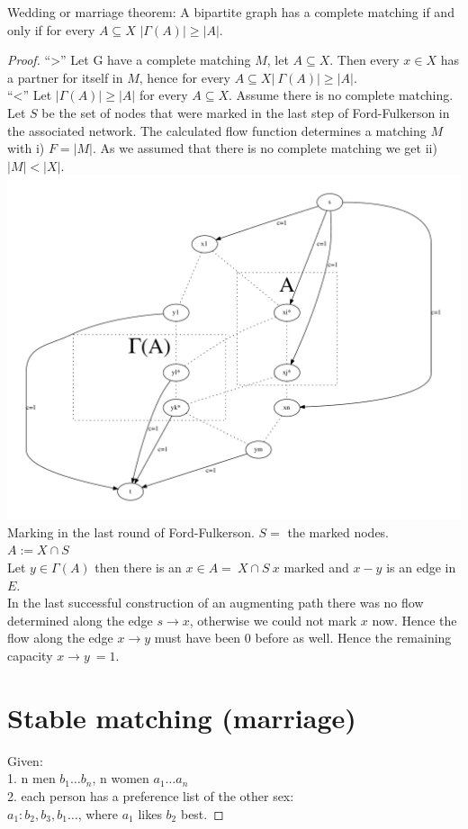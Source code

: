 \begin{theorem}
Wedding or marriage theorem: A bipartite graph has a complete matching if and only if for every $A \subseteq X$
$\lvert \Gamma(A) \rvert \ge \lvert A \rvert$.
\end{theorem}
\begin{proof}
``>'' Let G have a complete matching $M$, let $A \subseteq X$. Then every $x \in X$ has a partner for itself in $M$,
hence for every $A \subseteq X \lvert \: \Gamma(A) \rvert\ge \lvert A \rvert$. \\
``<'' Let $\lvert \Gamma (A) \rvert \ge \lvert A \rvert$ for every $A \subseteq X$. Assume there is no complete
matching. Let $S$ be the set of nodes that were marked in the last step of Ford-Fulkerson in the associated 
network. The calculated flow function determines a matching $M$ with i) $F=\lvert M \rvert$. As we assumed that there
is no complete matching we get ii) $\lvert M \rvert < \lvert X \rvert$.\\
\includegraphics[scale=0.45]{diagrams/Chapter4_Example5.pdf}\\
Marking in the last round of Ford-Fulkerson. $S=$ the marked nodes.\\
$A:=X \cap S$\\
Let $y \in \Gamma (A)$ then there is an $x \in A = \: X \cap S \: x$ marked and $x-y$ is an edge in $E$.\\
In the last successful construction of an augmenting path there was no flow determined along the edge $s \rightarrow x$,
otherwise we could not mark $x$ now. Hence the flow along the edge $x \rightarrow y$ must have been $0$ before 
as well. Hence the remaining capacity $x \rightarrow y \: = 1$.
\section{Stable matching (marriage)}
Given:\\ 
1. n men $b_{1} \dots b_{n}$, n women $a_{1} \dots a_{n}$\\
2. each person has a preference list of the other sex: \\
$a_{1}: b_{2}, b_{3}, b_{1} \dots$, where $a_{1}$ likes $b_{2}$ best.
\end{proof}
